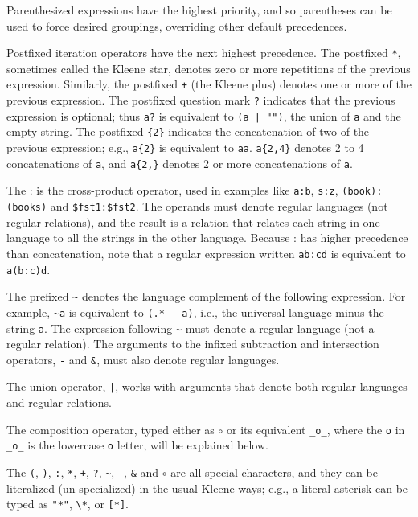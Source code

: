 \vspace{0.5cm}

Parenthesized expressions have the highest priority, and so parentheses can
be used to force desired groupings, overriding other default
precedences.

Postfixed iteration operators have the next highest precedence.
The postfixed \texttt{*}, sometimes called the Kleene star, denotes zero
or more repetitions of the previous expression.  Similarly, the
postfixed \texttt{+} (the Kleene plus) 
denotes one or more of the previous expression.
The postfixed question mark \texttt{?} indicates that the previous
expression is optional; thus \texttt{a?} is equivalent to \texttt{(a |
"")}, the union of \texttt{a} and the empty string.  The postfixed
\texttt{\{2\}} indicates the concatenation of two of the previous
expression; e.g., \texttt{a\{2\}} is equivalent to \texttt{aa}.
\texttt{a\{2,4\}} denotes 2 to 4 concatenations of \texttt{a}, and
\texttt{a\{2,\}} denotes 2 or more concatenations of \texttt{a}.

The : is the cross-product operator, used in examples like \texttt{a:b},
\texttt{s:z}, \texttt{(book):(books)} and \verb!$fst1:$fst2!.  The
operands must denote regular languages (not regular relations), and the
result is a relation that relates each string in one language to all the
strings in the other language.  Because : has higher precedence than
concatenation, note that a regular expression written \texttt{ab:cd} is
equivalent to \texttt{a(b:c)d}.

The prefixed \texttt{\~{}} denotes the language complement of the
following expression.  For example, \texttt{\~{}a} is equivalent to
\texttt{(.* - a)}, i.e., the universal language minus the string
\texttt{a}.  The expression following \texttt{\~{}} must denote a
regular language (not a regular relation).  The arguments to the infixed
subtraction and intersection operators, \verb!-! and \verb!&!, must also
denote regular languages.

The union operator, \verb!|!, works with arguments that denote both
regular languages and regular relations.

The composition operator, typed either as $\circ$ or its 
equivalent \texttt{\_o\_}, where the \texttt{o} in \texttt{\_o\_} is the
lowercase \texttt{o} letter, will be explained below.

The \texttt{(}, \texttt{)}, \texttt{:}, \texttt{*}, \texttt{+},
\texttt{?}, \texttt{\~{}}, \texttt{-}, \texttt{\&} and $\circ$ are all
special characters, and they can be literalized (un-specialized) in the
usual Kleene ways; e.g., a literal asterisk can be typed as
\texttt{"*"}, \verb!\*!, or \verb![*]!.

